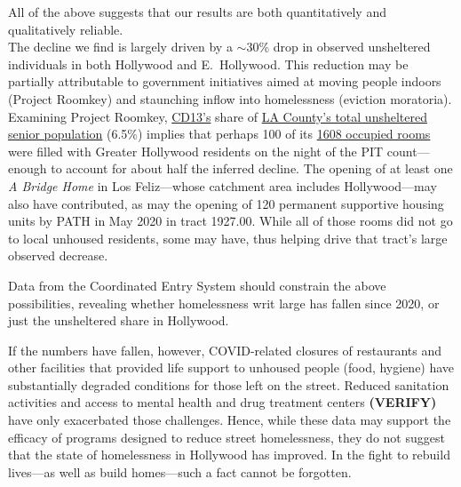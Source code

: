 \documentclass[11pt]{article}
\def\bfr{\bf\color{red}}
\begin{document}

All of the above suggests that our results are both quantitatively and qualitatively reliable.\\

 The decline we find is largely driven by a $\sim$30\% drop in observed 
unsheltered individuals in both Hollywood and E.~Hollywood. This reduction may be partially attributable to 
government initiatives aimed at moving people indoors (Project Roomkey) and staunching inflow into homelessness 
(eviction moratoria). Examining Project Roomkey, \href{https://www.lahsa.org/documents?id=4672-2020-homeless-count-council-district-13}
{CD13's} share of \href{https://www.lahsa.org/documents?id=4585-2020-greater-los-angeles-homeless-count-los-angeles-continuum-of-care-coc-}{LA County's total unsheltered senior population} (6.5\%) implies that perhaps 100 of its 
\href{https://projectroomkeytracker.com/}{1608 occupied rooms} were filled with Greater Hollywood 
residents on the night of the PIT count---enough to account for about half the inferred decline. 
The opening of at least one {\it A Bridge Home} in Los Feliz---whose catchment area includes Hollywood---may 
also have contributed, as may the opening of 120 permanent supportive housing units by PATH in May 2020 
in tract 1927.00. While all of those rooms did not go to local unhoused residents, some may have, thus 
helping drive that tract's large observed decrease. 

Data from the Coordinated Entry System should constrain the above possibilities, revealing whether homelessness 
writ large has fallen since 2020, or just the unsheltered share in Hollywood.

If the numbers have fallen, however, COVID-related closures of restaurants and other facilities that
provided life support to unhoused people (food, hygiene) have substantially degraded conditions 
for those left on the street. Reduced sanitation activities and access to mental health and drug treatment centers 
{\bfr (VERIFY)} have only exacerbated those challenges. Hence, while these data may support the efficacy of 
programs designed to reduce street homelessness, they do not suggest that the state of homelessness 
in Hollywood has improved. In the fight to rebuild lives---as well as build homes---such a fact cannot be forgotten.
\end{document}
